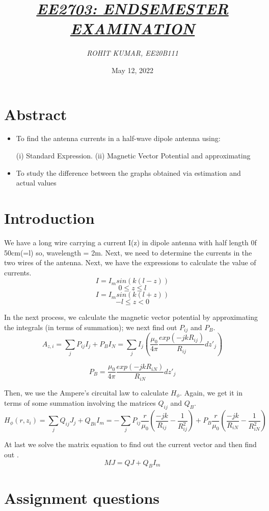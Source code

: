 \documentclass{article}
\title{\underline{\textit{\Large{EE2703: ENDSEMESTER EXAMINATION}}}}
\author{\textit{ROHIT KUMAR, EE20B111}}
\date{May 12, 2022}
\begin{document}
\maketitle

\section{Abstract}
\begin{itemize}
\item To find the antenna currents in a half-wave dipole antenna using:

(i) Standard Expression.
(ii) Magnetic Vector Potential and approximating
\item To study the difference between the graphs obtained via estimation and actual values
\end{itemize}

\section{Introduction}
We have a long wire carrying a current I(z) in dipole antenna with half length 0f 50cm(=l)
so, wavelength = 2m. Next, we need to determine the currents in the two wires of the antenna. Next, we have the expressions to calculate the value of currents.
$$I = I_{m}sin(k(l-z)) $$ $$  0\leq z \leq l$$
$$I = I_{m}sin(k(l+z)) $$ $$  -l\leq z < 0 $$


In the next process, we calculate the magnetic vector potential by approximating the integrals (in terms of summation); we next find out $P_{ij}$ and $P_{B}$.
$$A_{z,i} = \sum_{j}P_{ij}I_{j} + P_{B}I_{N} = \sum_{j}I_{j}(\frac{\mu_{0}}{4\pi}\frac{exp(-jkR_{ij})}{R_{ij}}dz'_{j})$$

$$P_{B} = \frac{\mu_{0}}{4\pi}\frac{exp(-jkR_{iN})}{R_{iN}}dz'_{j}$$

Then, we use the Ampere's circuital law to calculate $H_{\phi}$. Again, we get it in terms of some summation involving the matrices $Q_{ij}$ and $Q_{B}$. 
$$H_{\phi}(r,z_{i}) = \sum_{j}Q_{ij}J_{j} + Q_{Bi}I_{m} = -\sum_{j}P_{ij}\frac{r}{\mu_{0}}(\frac{-jk}{R_{ij}} - \frac{1}{R^2_{ij}}) + P_{B}\frac{r}{\mu_{0}}(\frac{-jk}{R_{iN}} - \frac{1}{R^2_{iN}})$$


At last we solve the matrix equation to find out the current vector  and then find out .
$$MJ = QJ + Q_{B}I_{m}$$


\section{Assignment questions}
\end{document}
